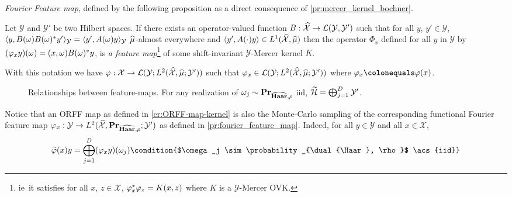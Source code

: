 \documentclass[twoside,11pt]{article}
\begin{document}
\emph{Fourier Feature map}, defined by the following proposition as a direct
consequence of \cref{pr:mercer_kernel_bochner}.
\begin{proposition}
    \label{pr:fourier_feature_map} Let $\mathcal{Y}$ and $\mathcal{Y}'$ be two
    Hilbert spaces. If there exists an operator-valued function
    $B:\widehat{\mathcal{X}}\to\mathcal{L}(\mathcal{Y},\mathcal{Y}')$ such that
    for all $y$, $y'\in\mathcal{Y}$, $\langle y, B(\omega)B(\omega)^*
    y'\rangle_{\mathcal{Y}} =\langle y', A(\omega)y\rangle_{\mathcal{Y}}$
    $\widehat{\mu}$-almost everywhere and $\langle y', A(\cdot)y\rangle\in
    L^1(\widehat{\mathcal{X}},\widehat{\mu})$ then the operator $\Phi_x$ defined for
    all $y$ in $\mathcal{Y}$ by $(\Phi_x
    y)(\omega)=\pairing{x,\omega}B(\omega)^\adjoint y$, is \emph{a feature
    map}\footnote{\acs{ie}~it satisfies for all $x$, $z \in \mathcal{X}$,
    $\Phi_x^\adjoint \Phi_z=K(x,z)$ where $K$ is a $\mathcal{Y}$-Mercer
    \acs{OVK}.} of some shift-invariant $\mathcal{Y}$-Mercer kernel $K$.
\end{proposition}
With this notation we have $\Phi: \mathcal{X} \to \mathcal{L}(\mathcal{Y};
L^2(\dual{\mathcal{X}}, \dual{\mu}; \mathcal{Y}'))$ such that $\Phi_x\in
\mathcal{L}(\mathcal{Y}; L^2(\dual{\mathcal{X}}, \dual{\mu}; \mathcal{Y}'))$
where $\Phi_x\colonequals\Phi(x)$.
\begin{figure}[t]
    \centering
    \resizebox{\textwidth}{!}{%
    }
    \caption[Relationships between feature-maps.]{Relationships between
    feature-maps. For any realization of
    $\omega_j\sim\probability_{\dual{\Haar},\rho}$ \ac{iid},
    $\widetilde{\mathcal{H}} = \operatorname*{\bigoplus}_{j=1}^D \mathcal{Y}'$.}
    \label{fig:rel_features}
\end{figure}
Notice that an \acs{ORFF} map as defined in \cref{cr:ORFF-map-kernel} is also
the Monte-Carlo sampling of the corresponding functional Fourier feature map
$\Phi_x: \mathcal{Y} \to L^2(\dual{\mathcal{X}}, \probability_{\dual{\Haar},
\rho}; \mathcal{Y}' )$ as defined in \cref{pr:fourier_feature_map}.  Indeed,
for all $y\in\mathcal{Y}$ and all $x\in\mathcal{X}$,
\begin{dmath*}
    \tildePhi{\omega}(x)y = \Vect_{j=1}^D (\Phi_x y)(\omega_j)
    \condition{$\omega_j \sim \probability_{\dual{\Haar}, \rho}$ \acs{iid}}
\end{dmath*}
\end{document}
